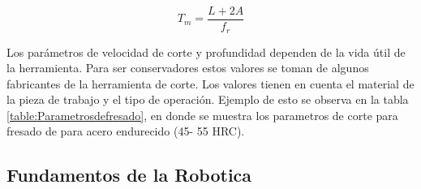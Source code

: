 \begin{equation}
    T_{m}=\frac{L+2A}{f_{r}}
\end{equation}

Los parámetros de velocidad de corte y profundidad dependen de la vida útil de la herramienta. Para ser conservadores estos valores se toman de algunos fabricantes de la herramienta de corte. Los valores tienen en cuenta el material de la pieza de trabajo y el tipo de operación. Ejemplo de esto se observa en la tabla \ref{table:Parametrosdefresado}, en donde se muestra los parametros de corte para fresado de para acero endurecido (45- 55 HRC).



\subsection{Fundamentos de la Robotica}

